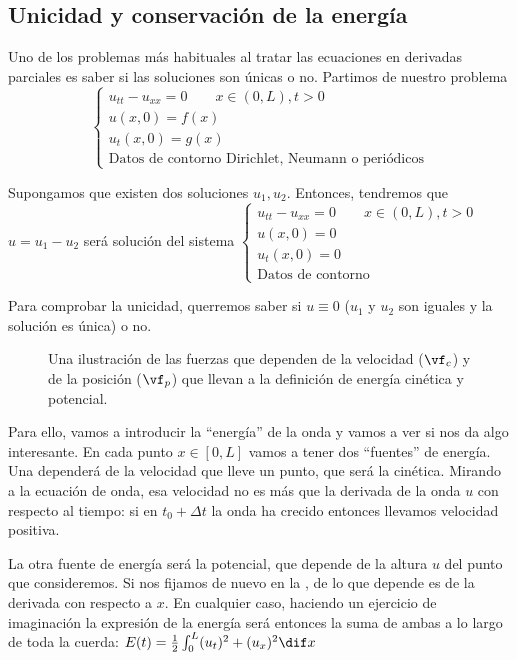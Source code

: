 	\subsection{Unicidad y conservación de la energía}

		Uno de los problemas más habituales al tratar las ecuaciones en derivadas parciales es saber si las soluciones son únicas o no. Partimos de nuestro problema
		\[ \begin{cases}
			u_{tt}-u_{xx} = 0\qquad x \in (0,L), t >0 \\
			u(x,0) = f(x)	\\
			u_t(x,0) = g(x) \\
			\text{Datos de contorno Dirichlet, Neumann o periódicos}
		\end{cases} \]

		Supongamos que existen dos soluciones $u_1, u_{2}$. Entonces, tendremos que $u = u_1 - u_2$ será solución del sistema
		\( \begin{cases}
			u_{tt}-u_{xx} = 0\qquad x \in (0,L), t >0 \\
			u(x,0) = 0	\\
			u_t(x,0) = 0 \\
			\text{Datos de contorno}
		\end{cases} \label{eq:Onda:ProblemaUnicidad} \)

		Para comprobar la unicidad, querremos saber si $u \equiv 0$ ($u_1$ y $u_2$ son iguales y la solución es única) o no.

		\begin{figure}[hbtp]
		\centering
		\caption{Una ilustración de las fuerzas que dependen de la velocidad ($\vf_c$) y de la posición ($\vf_p$) que llevan a la definición de energía cinética y potencial.}
		\label{fig:EnergiaOnda}
		\end{figure}

		Para ello, vamos a introducir la ``energía'' de la onda y vamos a ver si nos da algo interesante. En cada punto $x ∈ [0,L]$ vamos a tener dos ``fuentes'' de energía. Una dependerá de la velocidad que lleve un punto, que será la cinética. Mirando a la ecuación de onda, esa velocidad no es más que la derivada de la onda $u$ con respecto al tiempo: si en $t_0 + Δt$ la onda ha crecido entonces llevamos velocidad positiva.

		La otra fuente de energía será la potencial, que depende de la altura $u$ del punto que consideremos. Si nos fijamos de nuevo en la , de lo que depende es de la derivada con respecto a $x$. En cualquier caso, haciendo un ejercicio de imaginación la expresión de la energía será entonces la suma de ambas a lo largo de toda la cuerda:
		\( E(t) = \frac{1}{2} \int_0^L (u_t)^2 + (u_x)^2 \dif x \label{eq:Onda:Energia} \)

